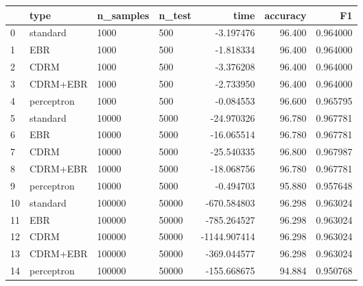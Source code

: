 \begin{tabular}{llllrrr}
\toprule
{} &        type & n\_samples & n\_test &         time &  accuracy &        F1 \\
\midrule
0  &    standard &      1000 &    500 &    -3.197476 &    96.400 &  0.964000 \\
1  &         EBR &      1000 &    500 &    -1.818334 &    96.400 &  0.964000 \\
2  &        CDRM &      1000 &    500 &    -3.376208 &    96.400 &  0.964000 \\
3  &    CDRM+EBR &      1000 &    500 &    -2.733950 &    96.400 &  0.964000 \\
4  &  perceptron &      1000 &    500 &    -0.084553 &    96.600 &  0.965795 \\
5  &    standard &     10000 &   5000 &   -24.970326 &    96.780 &  0.967781 \\
6  &         EBR &     10000 &   5000 &   -16.065514 &    96.780 &  0.967781 \\
7  &        CDRM &     10000 &   5000 &   -25.540335 &    96.800 &  0.967987 \\
8  &    CDRM+EBR &     10000 &   5000 &   -18.068756 &    96.780 &  0.967781 \\
9  &  perceptron &     10000 &   5000 &    -0.494703 &    95.880 &  0.957648 \\
10 &    standard &    100000 &  50000 &  -670.584803 &    96.298 &  0.963024 \\
11 &         EBR &    100000 &  50000 &  -785.264527 &    96.298 &  0.963024 \\
12 &        CDRM &    100000 &  50000 & -1144.907414 &    96.298 &  0.963024 \\
13 &    CDRM+EBR &    100000 &  50000 &  -369.044577 &    96.298 &  0.963024 \\
14 &  perceptron &    100000 &  50000 &  -155.668675 &    94.884 &  0.950768 \\
\bottomrule
\end{tabular}
